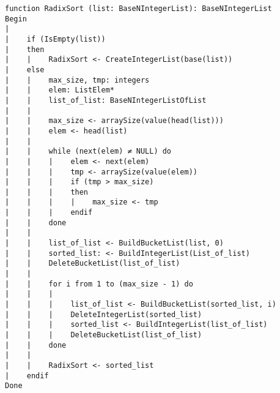 \begin{lstlisting}[breaklines]
function RadixSort (list: BaseNIntegerList): BaseNIntegerList
Begin
|
|    if (IsEmpty(list))
|    then
|    |    RadixSort <- CreateIntegerList(base(list))
|    else
|    |    max_size, tmp: integers
|    |    elem: ListElem*
|    |    list_of_list: BaseNIntegerListOfList
|    |
|    |    max_size <- arraySize(value(head(list)))
|    |    elem <- head(list)
|    |
|    |    while (next(elem) ≠ NULL) do
|    |    |    elem <- next(elem)
|    |    |    tmp <- arraySize(value(elem))
|    |    |    if (tmp > max_size)
|    |    |    then
|    |    |    |    max_size <- tmp
|    |    |    endif
|    |    done
|    |
|    |    list_of_list <- BuildBucketList(list, 0)
|    |    sorted_list: <- BuildIntegerList(List_of_list)
|    |    DeleteBucketList(list_of_list)
|    |
|    |    for i from 1 to (max_size - 1) do
|    |    |
|    |    |    list_of_list <- BuildBucketList(sorted_list, i)
|    |    |    DeleteIntegerList(sorted_list)
|    |    |    sorted_list <- BuildIntegerList(list_of_list)
|    |    |    DeleteBucketList(list_of_list)
|    |    done
|    |
|    |    RadixSort <- sorted_list
|    endif
Done
\end{lstlisting}
